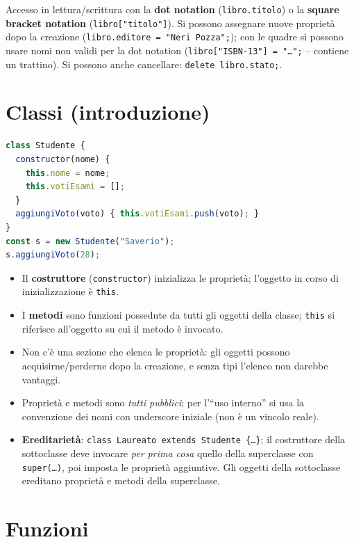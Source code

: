 Accesso in lettura/scrittura con la \textbf{dot notation} (\texttt{libro.titolo}) o la
\textbf{square bracket notation} (\texttt{libro["titolo"]}). Si possono assegnare nuove
propriet\`a dopo la creazione (\texttt{libro.editore = "Neri Pozza";}); con le quadre si
possono usare nomi non validi per la dot notation
(\texttt{libro["ISBN-13"] = "\dots";} -- contiene un trattino). Si possono anche cancellare:
\texttt{delete libro.stato;}.

\section{Classi (introduzione)}

\begin{lstlisting}[language=JavaScript]
class Studente {
  constructor(nome) {
    this.nome = nome;
    this.votiEsami = [];
  }
  aggiungiVoto(voto) { this.votiEsami.push(voto); }
}
const s = new Studente("Saverio");
s.aggiungiVoto(28);
\end{lstlisting}
\begin{itemize}
  \item Il \textbf{costruttore} (\texttt{constructor}) inizializza le propriet\`a; l'oggetto
        in corso di inizializzazione \`e \texttt{this}.
  \item I \textbf{metodi} sono funzioni possedute da tutti gli oggetti della classe;
        \texttt{this} si riferisce all'oggetto su cui il metodo \`e invocato.
  \item Non c'\`e una sezione che elenca le propriet\`a: gli oggetti possono
        acquisirne/perderne dopo la creazione, e senza tipi l'elenco non darebbe vantaggi.
  \item Propriet\`a e metodi sono \emph{tutti pubblici}; per l'``uso interno'' si usa la
        convenzione dei nomi con underscore iniziale (non \`e un vincolo reale).
  \item \textbf{Ereditariet\`a}: \texttt{class Laureato extends Studente \{\dots\}};
        il costruttore della sottoclasse deve invocare \emph{per prima cosa} quello della
        superclasse con \texttt{super(\dots)}, poi imposta le propriet\`a aggiuntive. Gli
        oggetti della sottoclasse ereditano propriet\`a e metodi della superclasse.
\end{itemize}

\section{Funzioni}

